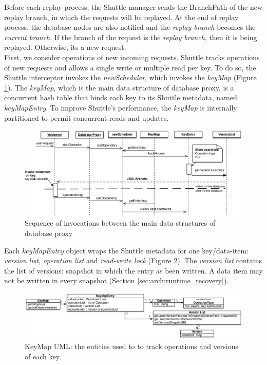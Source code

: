 Before each replay process, the Shuttle manager sends the BranchPath of the new replay branch, in which the requests will be replayed. At the end of replay process, the database nodes are also notified and the \textit{replay branch} becomes the \textit{current branch}. If the branch of the request is the \textit{replay branch}, then it is being replayed. Otherwise, its a new request.\\


First, we consider operations of new incoming requests. Shuttle tracks operations of new requests and allows a single write or multiple read per key. To do so, the Shuttle interceptor invokes the \emph{newScheduler}, which invokes the \emph{keyMap} (Figure \ref{fig:sequence_normal}). The \emph{keyMap}, which is the main data structure of database proxy, is a concurrent hash table that binds each  key to its Shuttle metadata, named \emph{keyMapEntry}. To improve Shuttle's performance, the \emph{keyMap} is internally partitioned to permit concurrent reads and updates.

\begin{figure}
  \centering
  \includegraphics[width=\textwidth]{arch/operation_database}
  \caption{Sequence of invocations between the main data structures of database proxy }
  \label{fig:sequence_normal}
\end{figure}


Each \emph{keyMapEntry} object wraps the Shuttle metadata for one key/data-item: \emph{version list}, \emph{operation list} and \emph{read-write lock} (Figure \ref{fig:keymap}). The \emph{version list} contains the list of versions: snapshot in which the entry as been written. A data item may not be written in every snapshot (Section \ref{sec:arch:runtime_recovery}). 

\begin{figure}
  \centering
  \includegraphics[width=\textwidth]{arch/keymap}
  \caption{KeyMap UML: the entities used to to track operations and versions of each key.}
  \label{fig:keymap}
\end{figure}


